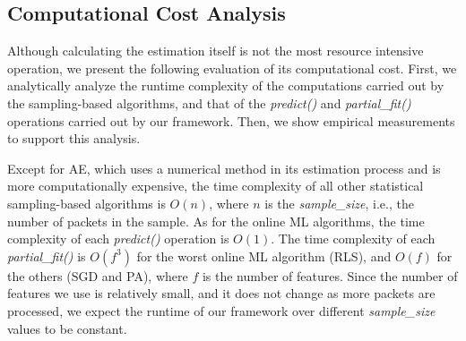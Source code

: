 	\subsection{Computational Cost Analysis} \label{sec:computational_cost}
	
		Although calculating the estimation itself is not the most resource intensive operation, we present the following evaluation of its computational cost. First, we analytically analyze the runtime complexity of the computations carried out by the sampling-based algorithms, and that of the \emph{predict()} and \emph{partial\_fit()} operations carried out by our framework. Then, we show empirical measurements to support this analysis.
		
		Except for AE, which uses a numerical method in its estimation process and is more computationally expensive, the time complexity of all other statistical sampling-based algorithms is $O(n)$, where $n$ is the \emph{sample\_size}, i.e., the number of packets in the sample. As for the online ML algorithms, the time complexity of each \emph{predict()} operation is $O(1)$. The time complexity of each \emph{partial\_fit()} is $O(f^3)$ for the worst online ML algorithm (RLS), and $O(f)$ for the others (SGD and PA), where $f$ is the number of features. Since the number of features we use is relatively small, and it does not change as more packets are processed, we expect the runtime of our framework over different \emph{sample\_size} values to be constant.
		
